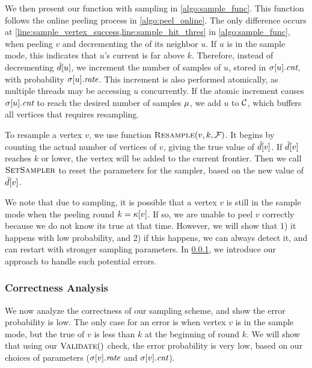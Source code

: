 We then present our \FPeel{} function with sampling in \cref{algo:sample_func}. 
This function follows the online peeling process in \cref{algo:peel_online}. 
The only difference occurs at \cref{line:sample_vertex_success,line:sample_hit_thres} in \cref{algo:sample_func}, when peeling $v$ and decrementing the \induceddegree{} of its neighbor $u$. 
If $u$ is in the sample mode, this indicates that $u$'s current \induceddegree{} is far above $k$. 
Therefore, instead of decrementing $\tilde{d}[u]$, we increment the number of samples of $u$, stored in $\sigma[u].\text{\it cnt}$, with probability $\sigma[u].\text{\it rate}$. 
This increment is also performed atomically, as multiple threads may be accessing $u$ concurrently. 
If the atomic increment causes $\sigma[u].\text{\it cnt}$ to reach the desired number of samples $\mathit{\mu}$, we add $u$ to $\mathcal{C}$, 
which buffers all vertices that requires resampling. 

To resample a vertex $v$, we use function ${\mbox{\sc{Resample}}}(v,k,{\mathcal{F}})$. 
It begins by counting the actual number of \alive{} vertices of $v$, giving the true value of $\tilde{d}[v]$.
If $\tilde{d}[v]$ reaches $k$ or lower, the vertex will be added to the current frontier.
Then we call ${\mbox{\sc{SetSampler}}}$ to reset the parameters for the sampler, based on the new value of $\tilde{d}[v]$. 

We note that due to sampling, it is possible that a vertex $v$ is still in the sample mode when the peeling round $k={\kappa}[v]$. 
If so, we are unable to peel $v$ correctly because we do not know its true \induceddegree{} at that time. 
However, we will show that 1) it happens with low probability, and 2) if this happens, we can always detect it, 
and can restart with stronger sampling parameters. 
In \cref{sec:calc_error}, we introduce our approach to handle such potential errors. 

\subsubsection{Correctness Analysis} \label{sec:calc_error}
We now analyze the correctness of our sampling scheme, and show the error probability is low.
The only case for an error is when vertex $v$ is in the sample mode, but the true \induceddegree{} of $v$ is less than $k$ at the beginning of round $k$. 
We will show that using our ${\mbox{\sc{Validate}}}()$ check, the error probability is very low, based on our choices of parameters ($\sigma[v].\text{\it rate}$ and $\sigma[v].\text{\it cnt}$).

